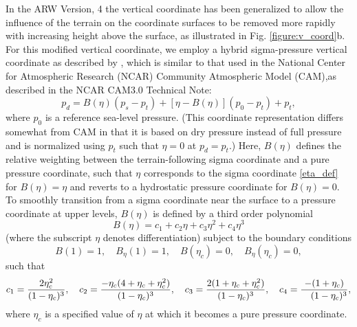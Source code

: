 In the ARW Version, 4 the vertical coordinate has been generalized to allow the
influence of the terrain on the coordinate surfaces to be removed more rapidly
with increasing height above the surface, as illustrated in Fig. \ref{figure:v_coord}b. For this modified  vertical coordinate, we employ a hybrid sigma-pressure vertical coordinate as described by \citet{park13}, which is similar to that used in the National Center for Atmospheric Research (NCAR) Community Atmospheric Model (CAM),as described in the NCAR CAM3.0 Technical Note:
%
\begin{equation}
p_d = B(\eta)(p_{s}-p_t) + [\eta-B(\eta)](p_0-{p_t})+p_t,          
\label{hyb_def}
 \end{equation}
%
where $p_0$ is a reference sea-level pressure. (This coordinate representation differs somewhat from CAM in that it is based on dry pressure instead of full pressure and is normalized using $p_t$ such that $\eta=0$ at $p_d = p_t$.) Here, $B(\eta)$ defines the relative weighting between the terrain-following sigma coordinate and a pure pressure coordinate, such that $\eta$ corresponds to the sigma coordinate \eqref{eta_def} for $B(\eta) = \eta$ and reverts to a hydrostatic pressure coordinate for $B(\eta) = 0$. To smoothly transition from a sigma coordinate near the surface to a pressure coordinate at upper levels, $B(\eta)$ is defined by a third order polynomial
%
\begin{equation}
B(\eta) = c_1+c_2\eta+c_3\eta^2+c_4\eta^3         
\label{B_def}
 \end{equation}
%
(where the subscript $\eta$ denotes differentiation) subject to the boundary conditions
%
\begin{equation}
B(1)=1,\quad B_\eta(1)=1, \quad B(\eta_c)=0, \quad B_\eta(\eta_c)=0,         
\label{B_bc}
 \end{equation}
%
such that
%
\begin{equation}
c_1={2\eta_c^2\over(1-\eta_c)^3},  \quad      
c_2={-\eta_c(4+\eta_c+\eta_c^2)\over(1-\eta_c)^3},  \quad      
c_3={2(1+\eta_c+\eta_c^2)\over(1-\eta_c)^3},  \quad      
c_4={-(1+\eta_c)\over\ \ \ (1-\eta_c)^3},    
\label{B_cof}
 \end{equation}
where $\eta_c$ is a specified value of $\eta$ at which it becomes a pure pressure coordinate.%
%
